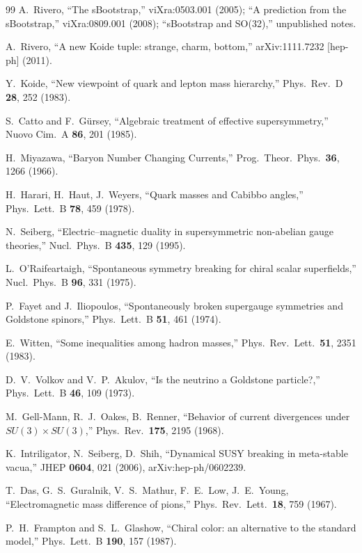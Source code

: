 \documentclass[12pt,a4paper]{article}
\begin{document}
\begin{thebibliography}{99}
A.~Rivero, ``The sBootstrap,'' viXra:0503.001 (2005);
``A prediction from the sBootstrap,'' viXra:0809.001 (2008);
``sBootstrap and SO(32),'' unpublished notes.

A.~Rivero, ``A new Koide tuple: strange, charm, bottom,'' 
arXiv:1111.7232 [hep-ph] (2011).

Y.~Koide, ``New viewpoint of quark and lepton mass hierarchy,'' 
Phys.\ Rev.\ D \textbf{28}, 252 (1983).

S.~Catto and F.~G\"ursey, ``Algebraic treatment of effective 
supersymmetry,'' Nuovo Cim.\ A \textbf{86}, 201 (1985).

H.~Miyazawa, ``Baryon Number Changing Currents,'' 
Prog.\ Theor.\ Phys.\ \textbf{36}, 1266 (1966).

H.~Harari, H.~Haut, J.~Weyers, ``Quark masses and Cabibbo 
angles,'' Phys.\ Lett.\ B \textbf{78}, 459 (1978).

N.~Seiberg, ``Electric--magnetic duality in supersymmetric 
non-abelian gauge theories,'' Nucl.\ Phys.\ B \textbf{435}, 129 
(1995).

L.~O'Raifeartaigh, ``Spontaneous symmetry breaking for chiral 
scalar superfields,'' Nucl.\ Phys.\ B \textbf{96}, 331 (1975).

P.~Fayet and J.~Iliopoulos, ``Spontaneously broken supergauge 
symmetries and Goldstone spinors,'' Phys.\ Lett.\ B \textbf{51}, 
461 (1974).

E.~Witten, ``Some inequalities among hadron masses,'' 
Phys.\ Rev.\ Lett.\ \textbf{51}, 2351 (1983).

D.~V.~Volkov and V.~P.~Akulov, ``Is the neutrino a Goldstone 
particle?,'' Phys.\ Lett.\ B \textbf{46}, 109 (1973).

M.~Gell-Mann, R.~J.~Oakes, B.~Renner, ``Behavior of current 
divergences under $SU(3) \times SU(3)$,'' 
Phys.\ Rev.\ \textbf{175}, 2195 (1968).

K.~Intriligator, N.~Seiberg, D.~Shih, ``Dynamical SUSY breaking 
in meta-stable vacua,'' JHEP \textbf{0604}, 021 (2006),
arXiv:hep-ph/0602239.

T.~Das, G.~S.~Guralnik, V.~S.~Mathur, F.~E.~Low, J.~E.~Young,
``Electromagnetic mass difference of pions,''
Phys.\ Rev.\ Lett.\ \textbf{18}, 759 (1967).

P.~H.~Frampton and S.~L.~Glashow, ``Chiral color: an alternative 
to the standard model,'' Phys.\ Lett.\ B \textbf{190}, 157 (1987).

\end{thebibliography}
\end{document}
